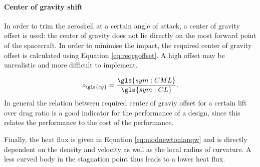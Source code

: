 \paragraph{Center of gravity shift}
In order to trim the aeroshell at a certain angle of attack, a center of gravity offset is used: the center of gravity does not lie directly on the most forward point of the spacecraft. In order to minimise the impact, the required center of gravity offset is calculated using Equation \ref{eq:reqcgoffset}. A high offset may be unrealistic and more difficult to implement.

\begin{equation} \label{eq:reqcgoffset}
z_{\gls{cg}} = \frac{\gls{sym:CML}}{\gls{sym:CL}}.
\end{equation}
In general the relation between required center of graviy offset for a certain lift over drag ratio is a good indicator for the performance of a design, since this relates the performance to the cost of the performance.

Finally, the heat flux is given in Equation \ref{eq:modnewtonianqw} and is directly dependent on the density and velocity as well as the local radius of curvature. A less curved body in the stagnation point thus leads to a lower heat flux.



